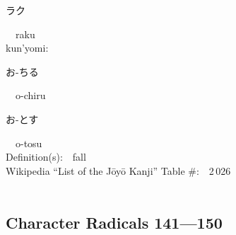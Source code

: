 \begin{multicols}{2}
{\hspace*{2em}}{\begin{CJK}{UTF8}{min} ラク \end{CJK}}\ \ raku\ \ \\
{\hspace*{1em}}kun'yomi:\ \ \\
{\hspace*{2em}}{\begin{CJK}{UTF8}{min} お-ちる \end{CJK}}\ \ o-chiru\ \ \\
{\hspace*{2em}}{\begin{CJK}{UTF8}{min} お-とす \end{CJK}}\ \ o-tosu\ \ \\
Definition(s):\ \ fall \\
Wikipedia ``List of the J\=oy\=o Kanji'' Table \#:\ \ 2\,026 \\
\ \ \\
\end{multicols}



\newpage



\subsection*{Character Radicals 141---150 }
  \label{P3-S16}

